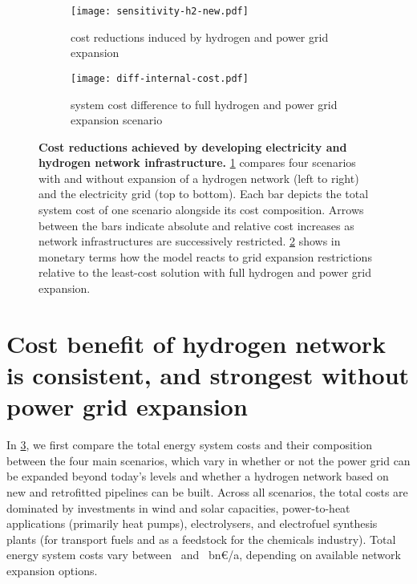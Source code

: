 \begin{figure}
    \centering
    \begin{subfigure}[t]{\textwidth}
        \centering
        \caption{cost reductions induced by hydrogen and power grid expansion}
        \texttt{[image: sensitivity-h2-new.pdf]}
        \label{fig:sensitivity-h2-a}
    \end{subfigure}
    \begin{subfigure}[t]{\textwidth}
        \centering
        \caption{system cost difference to full hydrogen and power grid expansion scenario}
        \texttt{[image: diff-internal-cost.pdf]}
        \label{fig:sensitivity-h2-b}
    \end{subfigure}
    \caption{\textbf{Cost reductions achieved by developing electricity and hydrogen
    network infrastructure.} \cref{fig:sensitivity-h2-a} compares four scenarios
    with and without expansion of a hydrogen network (left to right) and the
    electricity grid (top to bottom). Each bar depicts the total system cost of
    one scenario alongside its cost composition. Arrows between the bars
    indicate absolute and relative cost increases as network infrastructures are
    successively restricted. \cref{fig:sensitivity-h2-b} shows in monetary terms
    how the model reacts to grid expansion restrictions relative to the
    least-cost solution with full hydrogen and power grid expansion.}
    \label{fig:sensitivity-h2}
\end{figure}

\section*{Cost benefit of hydrogen network is consistent, and strongest without power grid expansion}
\label{sec:h2}

In \cref{fig:sensitivity-h2}, we first compare the total energy system costs and
their composition between the four main scenarios, which vary in whether or not
the power grid can be expanded beyond today's levels and whether a hydrogen
network based on new and retrofitted pipelines can be built. Across all
scenarios, the total costs are dominated by investments in wind and solar
capacities, power-to-heat applications (primarily heat pumps), electrolysers,
and electrofuel synthesis plants (for transport fuels and as a feedstock for the
chemicals industry). Total energy system costs vary between \minsystemcost~and
\maxsystemcost~bn\euro/a, depending on available network expansion options.

